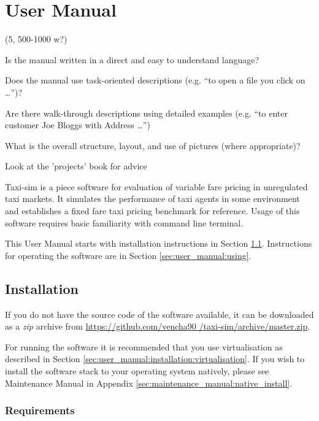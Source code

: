 \newpage
\section{User Manual}
\label{sec:user_manual}


(5, 500-1000 w?)

Is the manual written in a direct and easy to understand language?

Does the manual use task-oriented descriptions (e.g. “to open a file you click
on …”)?

Are there walk-through descriptions using detailed examples (e.g. “to enter
customer Joe Bloggs with Address …”)

What is the overall structure, layout, and use of pictures (where appropriate)?

Look at the 'projects' book for advice


Taxi-sim is a piece software for evaluation of variable fare pricing in
unregulated taxi markets. It simulates the performance of taxi agents in some
environment and establishes a fixed fare taxi pricing benchmark for reference.
Usage of this software requires basic familiarity with command line terminal.

This User Manual starts with installation instructions in Section
\ref{sec:user_manual:installation}. Instructions for operating the software are
in Section \ref{sec:user_manual:using}.


\subsection{Installation}
\label{sec:user_manual:installation}

If you do not have the source code of the software available, it can be
downloaded as a \textit{zip} archive from \url{https://github.com/vencha90
/taxi-sim/archive/master.zip}.

For running the software it is recommended that you use virtualisation as
described in Section \ref{sec:user_manual:installation:virtualisation}. If you
wish to install the software stack to your operating system natively, please
see Maintenance Manual in Appendix \ref{sec:maintenance_manual:native_install}.


\subsubsection{Requirements}

